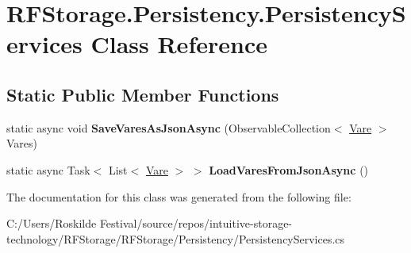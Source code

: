 \hypertarget{class_r_f_storage_1_1_persistency_1_1_persistency_services}{}\section{R\+F\+Storage.\+Persistency.\+Persistency\+Services Class Reference}
\label{class_r_f_storage_1_1_persistency_1_1_persistency_services}
\subsection*{Static Public Member Functions}
\begin{DoxyCompactItemize}
\item 
\mbox{\label{class_r_f_storage_1_1_persistency_1_1_persistency_services_a9b3b73e9abc1f79d221a5f43bcb9fc5e}} 
static async void {\bfseries Save\+Vares\+As\+Json\+Async} (Observable\+Collection$<$ \mbox{\hyperlink{class_r_f_storage_1_1_model_1_1_vare}{Vare}} $>$ Vares)
\item 
\mbox{\label{class_r_f_storage_1_1_persistency_1_1_persistency_services_a3e948758b411fffe7993d0bc7a428df4}} 
static async Task$<$ List$<$ \mbox{\hyperlink{class_r_f_storage_1_1_model_1_1_vare}{Vare}} $>$ $>$ {\bfseries Load\+Vares\+From\+Json\+Async} ()
\end{DoxyCompactItemize}


The documentation for this class was generated from the following file\+:\begin{DoxyCompactItemize}
\item 
C\+:/\+Users/\+Roskilde Festival/source/repos/intuitive-\/storage-\/technology/\+R\+F\+Storage/\+R\+F\+Storage/\+Persistency/Persistency\+Services.\+cs\end{DoxyCompactItemize}
